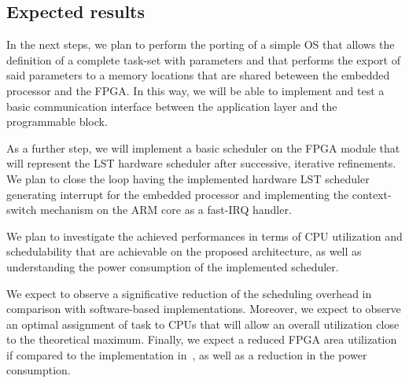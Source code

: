 \subsection{Expected results}

In the next steps, we plan to perform the porting of a simple OS that
allows the definition of a complete task-set with parameters and that
performs the export of said parameters to a memory locations that are
shared beteween the embedded processor and the FPGA. In this way, we
will be able to implement and test a basic communication interface
between the application layer and the programmable block.

As a further step, we will implement a basic scheduler on the FPGA
module that will represent the LST hardware scheduler after
successive, iterative refinements. We plan to close the loop having
the implemented hardware LST scheduler generating interrupt for the
embedded processor and implementing the context-switch mechanism on
the ARM core as a fast-IRQ handler.

We plan to investigate the achieved performances in terms of CPU
utilization and schedulability that are achievable on the proposed
architecture, as well as understanding the power consumption of the
implemented scheduler.

We expect to observe a significative reduction of the scheduling
overhead in comparison with software-based implementations. Moreover,
we expect to observe an optimal assignment of task to CPUs that will
allow an overall utilization close to the theoretical
maximum. Finally, we expect a reduced FPGA area utilization if
compared to the implementation in~\cite{GUPTA10}, as well as a
reduction in the power consumption.
